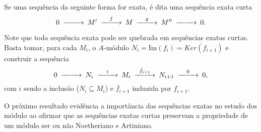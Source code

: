 \begin{definition}
	\label{loc:def_8_:_sequências_exatas.sequência_exata_curta}
	Se uma sequência da seguinte forma for exata, é dita uma sequência exata curta
	\begin{equation*}
		\begin{CD}
			0@>{}>>M'@>{f}>>M@>{g}>>M''@>{}>>0    .
		\end{CD}
	\end{equation*}

	Note que toda sequência exata pode ser quebrada em sequências exatas curtas. Basta tomar, para cada $M_{i}$, o $A$-módulo $N_{i}=\mathrm{Im}(f_{i})=Ker(f_{i+1})$ e construir a sequência
	\begin{equation*}
		\begin{CD}
			0 @>{}>>N_{i}@>{i}>>M_{i}@>{\bar{f}_{i+1}}>>N_{i+1}@>{0}>>0,
		\end{CD}
	\end{equation*}
	com $i$ sendo a inclusão ($N_{i}\subseteq M_{i}$) e $\bar{f}_{i+1}$ induzida por $f_{i+1}$.
\end{definition}
O próximo resultado evidência a importância das sequências exatas no estudo dos módulo ao afirmar que as sequências exatas curtas preservam a propriedade de um módulo ser ou não Noetheriano e Artiniano.
